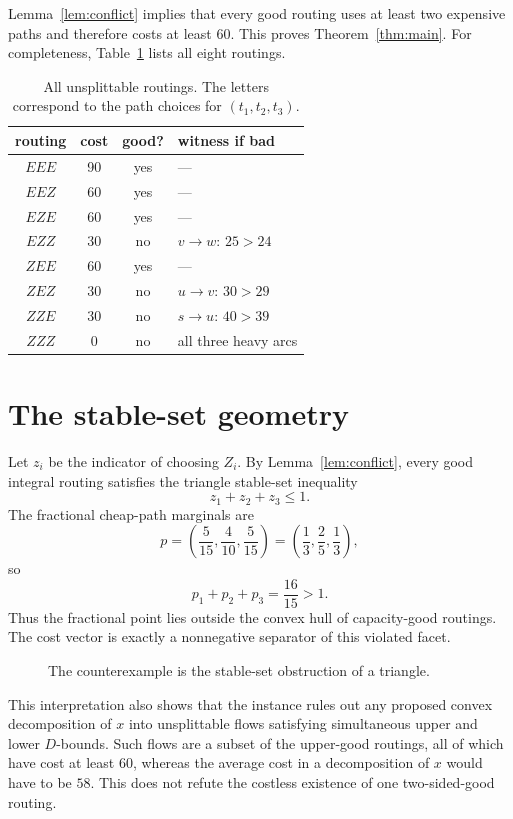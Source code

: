 \documentclass[11pt]{article}
\theoremstyle{definition}
\newcommand{\1}{\mathbf{1}}
\begin{document}
Lemma~\ref{lem:conflict} implies that every good routing uses at least two
expensive paths and therefore costs at least $60$.  This proves
Theorem~\ref{thm:main}.  For completeness, Table~\ref{tab:routings} lists all
eight routings.

\begin{table}[ht]
\centering
\caption{All unsplittable routings.  The letters correspond to the path
choices for $(t_1,t_2,t_3)$.}
\label{tab:routings}
\begin{tabular}{@{}cccl@{}}
\toprule
routing & cost & good? & witness if bad \\
\midrule
$EEE$ & 90 & yes & --- \\
$EEZ$ & 60 & yes & --- \\
$EZE$ & 60 & yes & --- \\
$EZZ$ & 30 & no  & $v\to w$: $25>24$ \\
$ZEE$ & 60 & yes & --- \\
$ZEZ$ & 30 & no  & $u\to v$: $30>29$ \\
$ZZE$ & 30 & no  & $s\to u$: $40>39$ \\
$ZZZ$ &  0 & no  & all three heavy arcs \\
\bottomrule
\end{tabular}
\end{table}

\section{The stable-set geometry}

Let $z_i$ be the indicator of choosing $Z_i$.  By
Lemma~\ref{lem:conflict}, every good integral routing satisfies the triangle
stable-set inequality
\[
 z_1+z_2+z_3\le1.
\]
The fractional cheap-path marginals are
\[
 p=\left(\frac5{15},\frac4{10},\frac5{15}\right)
  =\left(\frac13,\frac25,\frac13\right),
\]
so
\[
 p_1+p_2+p_3=\frac{16}{15}>1.
\]
Thus the fractional point lies outside the convex hull of capacity-good
routings.  The cost vector is exactly a nonnegative separator of this violated
facet.

\begin{figure}[ht]
\centering

\caption{The counterexample is the stable-set obstruction of a triangle.}
\label{fig:obstruction}
\end{figure}

This interpretation also shows that the instance rules out any proposed
convex decomposition of $x$ into unsplittable flows satisfying simultaneous
upper and lower $D$-bounds.  Such flows are a subset of the upper-good
routings, all of which have cost at least $60$, whereas the average cost in a
decomposition of $x$ would have to be $58$.  This does not refute the costless
existence of one two-sided-good routing.
\end{document}
